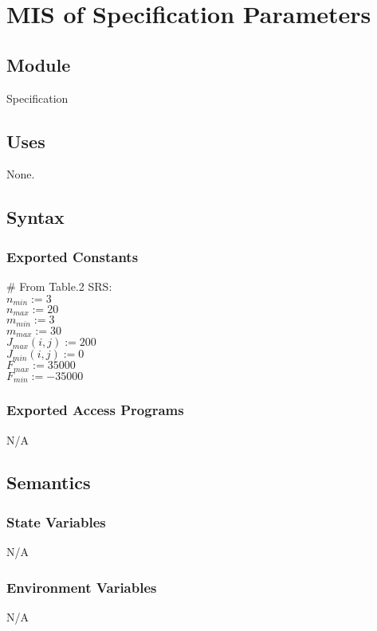 \documentclass[12pt, titlepage]{article}
\begin{document}
\section{MIS of Specification Parameters \label{mSpec} }

\subsection{Module}

Specification

\subsection{Uses}
None.

\subsection{Syntax}

\subsubsection{Exported Constants}
$\#$ From Table.2 SRS: \\
$n_{min}:=3$\\
$n_{max}:=20$\\
$m_{min}:=3$\\
$m_{max}:=30$\\
$J_{max}(i,j):=200$\\
$J_{min}(i,j):=0$\\
$F_{max}:=35000$\\
$F_{min}:=-35000$\\



\subsubsection{Exported Access Programs}
N/A
\subsection{Semantics}
\subsubsection{State Variables}
N/A

\subsubsection{Environment Variables}
N/A
\end{document}

